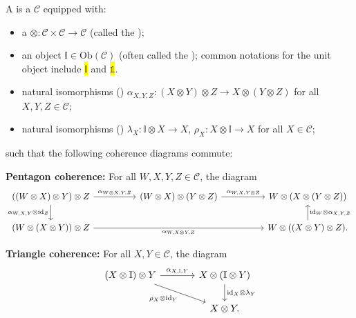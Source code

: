 \begin{definition} \label{definition:monoidal_category}
A  is a  $\mathcal{C}$ equipped with:
\begin{itemize}
    \item a  $\otimes : \mathcal{C} \times \mathcal{C} \to \mathcal{C}$ (called the );
    \item an object $\mathbb{I} \in \mathrm{Ob}(\mathcal{C})$ (often called the ); common notations for the unit object include \hl{$\mathbb{I}$} and \hl{$\mathds{1}$}.
    \item natural isomorphisms () $\alpha_{X,Y,Z} : (X \otimes Y) \otimes Z \to X \otimes (Y \otimes Z)$ for all $X, Y, Z \in \mathcal{C}$;
    \item natural isomorphisms () $\lambda_X : \mathbb{I} \otimes X \to X$, $\rho_X : X \otimes \mathbb{I} \to X$ for all $X \in \mathcal{C}$;
\end{itemize}


such that the following coherence diagrams commute:

\bigskip

\textbf{Pentagon coherence:} For all $W,X,Y,Z \in \mathcal{C}$, the diagram
$$\begin{tikzcd}[column sep=huge]
((W \otimes X) \otimes Y) \otimes Z \arrow[r, "\alpha_{W\otimes X, Y, Z}"] \arrow[d, "\alpha_{W,X,Y} \otimes \mathrm{id}_Z"'] & (W \otimes X) \otimes (Y \otimes Z) \arrow[r, "\alpha_{W,X,Y \otimes Z}"] & W \otimes (X \otimes (Y \otimes Z)) \\
(W \otimes (X \otimes Y)) \otimes Z \arrow[rr, "\alpha_{W,X \otimes Y, Z}"'] & & W \otimes ((X \otimes Y) \otimes Z) \arrow[u, "\mathrm{id}_W \otimes \alpha_{X,Y,Z}"'].
\end{tikzcd}$$

\bigskip

\textbf{Triangle coherence:} For all $X,Y \in \mathcal{C}$, the diagram
$$\begin{tikzcd}[column sep=large]
(X \otimes \mathbb{I}) \otimes Y \arrow[r, "\alpha_{X, \mathbb{I}, Y}"] \arrow[dr, "\rho_X \otimes \mathrm{id}_Y"'] & X \otimes (\mathbb{I} \otimes Y) \arrow[d, "\mathrm{id}_X \otimes \lambda_Y"] \\
& X \otimes Y.
\end{tikzcd}$$
\end{definition}
